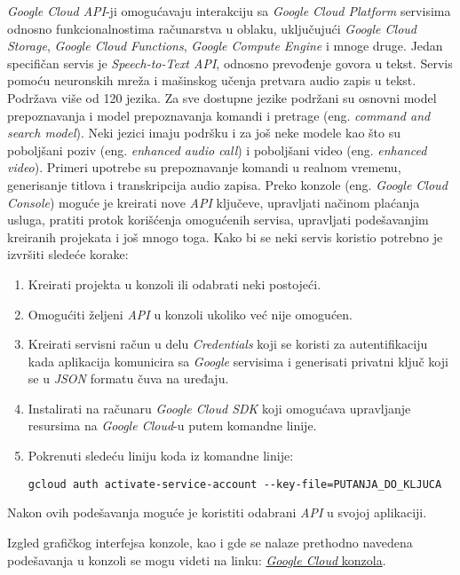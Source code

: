 \documentclass[android.tex]{subfiles}
\begin{document}
\textit{Google Cloud API}-ji omogućavaju interakciju sa \textit{Google Cloud Platform} servisima odnosno funkcionalnostima računarstva u oblaku, uključujući \textit{Google Cloud Storage}, \textit{Google Cloud Functions}, \textit{Google Compute Engine} i mnoge druge. Jedan specifičan servis je \textit{Speech-to-Text API}, odnosno prevođenje govora u tekst. Servis pomoću neuronskih mreža i mašinskog učenja pretvara audio zapis u tekst. Podržava više od 120 jezika. Za sve dostupne jezike podržani su osnovni model prepoznavanja i model prepoznavanja komandi i pretrage (eng. \textit{command and search model}). Neki jezici imaju podršku i za još neke modele kao što su poboljšani poziv (eng. \textit{enhanced audio call}) i poboljšani video (eng. \textit{enhanced video}). Primeri upotrebe su prepoznavanje komandi u realnom vremenu, generisanje titlova i transkripcija audio zapisa. Preko konzole (eng. \textit{Google Cloud Console}) moguće je kreirati nove \textit{API} ključeve, upravljati načinom plaćanja usluga, pratiti protok korišćenja omogućenih servisa, upravljati podešavanjim kreiranih projekata i još mnogo toga. Kako bi se neki servis koristio potrebno je izvršiti sledeće korake: 
\begin{enumerate}
    \item Kreirati projekta u konzoli ili odabrati neki postojeći.
    \item Omogućiti željeni \textit{API} u konzoli ukoliko već nije omogućen. 
    \item Kreirati servisni račun u delu \textit{Credentials} koji se koristi za autentifikaciju kada aplikacija komunicira sa \textit{Google} servisima i generisati privatni ključ koji se u \textit{JSON} formatu čuva na uređaju.
    \item Instalirati na računaru \textit{Google Cloud SDK} koji omogućava upravljanje resursima na \textit{Google Cloud}-u putem komandne linije.
    \item Pokrenuti sledeću liniju koda iz komandne linije:
    
    \verb|gcloud auth activate-service-account --key-file=PUTANJA_DO_KLJUCA|
\end{enumerate}
Nakon ovih podešavanja moguće je koristiti odabrani \textit{API} u svojoj aplikaciji.

Izgled grafičkog interfejsa  konzole, kao i gde se nalaze prethodno navedena podešavanja u konzoli se mogu videti na linku:
\href{https://cloud.google.com/speech-to-text/docs/ui-overview}{\textit{Google Cloud} konzola}.
\end{document}
